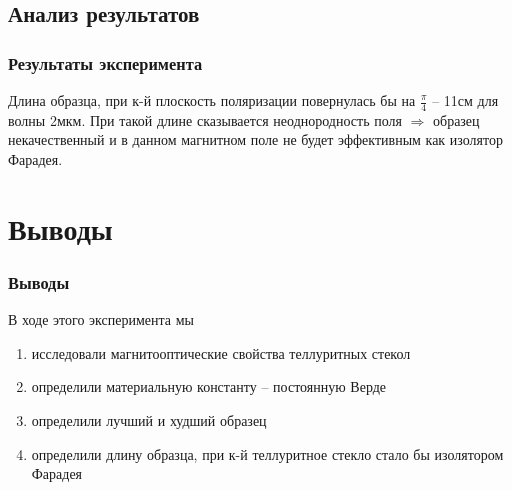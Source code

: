 \documentclass[10pt,pdf,hyperref={unicode}, dvipsnames]{beamer}
\begin{document}
\subsection{Анализ результатов}
\begin{frame}[t]\frametitle{Результаты эксперимента}
	
	\begin{figure}[tb]
		\centering
		\hspace{5em}
	\end{figure}
	
	Длина образца, при к-й плоскость поляризации повернулась бы на $\frac{\pi}{4}$ -- 11см для волны 2мкм. При такой длине сказывается неоднородность поля $\Rightarrow$ образец некачественный и в данном магнитном поле не будет эффективным как изолятор Фарадея.
\end{frame}
\section{Выводы}
\begin{frame}
	\frametitle{Выводы}
	В ходе этого эксперимента мы 
	\begin{enumerate}
		\item исследовали магнитооптические свойства теллуритных стекол
		\item определили материальную константу -- постоянную Верде
		\item определили лучший и худший образец
		\item определили длину образца, при к-й теллуритное стекло стало бы изолятором Фарадея
	\end{enumerate}
\end{frame}
\end{document}

